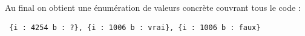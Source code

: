 \paragraph{}Au final on obtient une énumération de valeurs concrète couvrant 
tous le code : 
\begin{verbatim}
 {i : 4254 b : ?}, {i : 1006 b : vrai}, {i : 1006 b : faux}
\end{verbatim}


